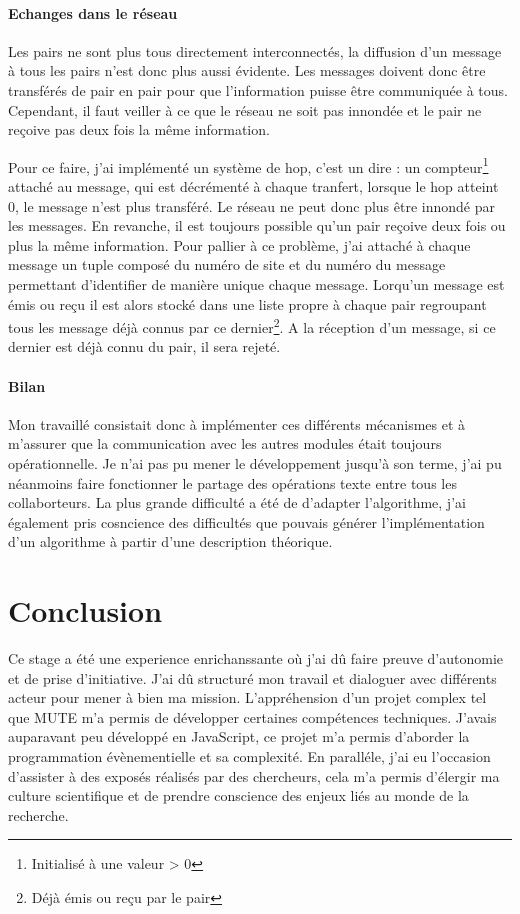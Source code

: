 \documentclass{tnreport}
\begin{document}
\subsubsection{Echanges dans le réseau}
Les pairs ne sont plus tous directement interconnectés, la diffusion d'un message à tous les pairs n'est donc plus aussi évidente. Les messages doivent donc être transférés de pair en pair pour que l'information puisse être communiquée à tous. Cependant, il faut veiller à ce que le réseau ne soit pas innondée et le pair ne reçoive pas deux fois la même information.

Pour ce faire, j'ai implémenté un système de hop, c'est un dire : un compteur\footnote{Initialisé à une valeur > 0} attaché au message, qui est décrémenté à chaque tranfert, lorsque le hop atteint 0, le message n'est plus transféré. Le réseau ne peut donc plus être innondé par les messages. En revanche, il est toujours possible qu'un pair reçoive deux fois ou plus la même information. Pour pallier à ce problème, j'ai attaché à chaque message un tuple composé du numéro de site et du numéro du message permettant d'identifier de manière unique chaque message. Lorqu'un message est émis ou reçu il est alors stocké dans une liste propre à chaque pair regroupant tous les message déjà connus par ce dernier\footnote{Déjà émis ou reçu par le pair}. A la réception d'un message, si ce dernier est déjà connu du pair, il sera rejeté. 

\subsubsection{Bilan}
Mon travaillé consistait donc à implémenter ces différents mécanismes et à m'assurer que la communication avec les autres modules était toujours opérationnelle. Je n'ai pas pu mener le développement jusqu'à son terme, j'ai pu néanmoins faire fonctionner le partage des opérations texte entre tous les collaborteurs. La plus grande difficulté a été de d'adapter l'algorithme, j'ai également pris cosncience des difficultés que pouvais générer l'implémentation d'un algorithme à partir d'une description théorique.

\chapter{Conclusion}
Ce stage a été une experience enrichanssante où j'ai dû faire preuve d'autonomie et de prise d'initiative. J'ai dû structuré mon travail et dialoguer avec différents acteur pour mener à bien ma mission. L'appréhension d'un projet complex tel que MUTE m'a permis de développer certaines compétences techniques. J'avais auparavant peu développé en JavaScript, ce projet m'a permis d'aborder la programmation évènementielle et sa complexité. En paralléle, j'ai eu l'occasion d'assister à des exposés réalisés par des chercheurs, cela m'a permis d'élergir ma culture scientifique et de prendre conscience des enjeux liés au monde de la recherche.
\end{document}
